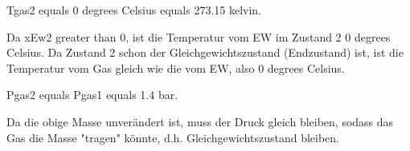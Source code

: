 Tgas2 equals 0 degrees Celsius equals 273.15 kelvin.

Da xEw2 greater than 0, ist die Temperatur vom EW im Zustand 2 0 degrees Celsius. Da Zustand 2 schon der Gleichgewichtszustand (Endzustand) ist, ist die Temperatur vom Gas gleich wie die vom EW, also 0 degrees Celsius.

Pgas2 equals Pgas1 equals 1.4 bar.

Da die obige Masse unverändert ist, muss der Druck gleich bleiben, sodass das Gas die Masse "tragen" könnte, d.h. Gleichgewichtszustand bleiben.